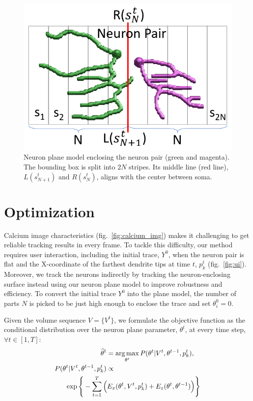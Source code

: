 \documentclass{article}
\DeclareMathOperator*{\argmax}{arg\,max}
\begin{document}
\begin{figure}[t]
	\centering
	\vspace{-10pt}
	\includegraphics[width=0.5\linewidth]{img/plane_model}
	\vspace{-10pt}
	\caption{\small{Neuron plane model enclosing the neuron pair (green and magenta). The bounding box is split into $2N$ stripes. Its middle line (red line), $L(s_{N+1}^t)$ and $R(s_N^t)$, aligns with the center between soma.}}
	\vspace{-10pt}
	\label{fig:planemodel}
\end{figure}


\section{Optimization}
Calcium image characteristics (fig.~\ref{fig:calcium_img}) makes it challenging to get reliable tracking results in every frame. To tackle this difficulty, our method requires user interaction, including the initial trace, $Y^0$, when the neuron pair is flat and the X-coordinate of the farthest dendrite tips at time $t$, $p^t_k$ (fig.~\ref{fig:ui}). Moreover, we track the neurons indirectly by tracking the neuron-enclosing surface instead using our neuron plane model to improve robustness and efficiency. To convert the initial trace $Y^0$ into the plane model, the number of parts $N$ is picked to be just high enough to enclose the trace and set $\theta_i^0 = 0$.

Given the volume sequence $V = \{V^t\}$, we formulate the objective function as the conditional distribution over the neuron plane parameter, $\theta^t$, at every time step, $\forall t \in [1, T]$:
\begin{equation}
\begin{aligned}
\widehat{\theta}^t & = \argmax_{\theta^t} P(\theta^t | V^t, \theta^{t-1}, p^t_k),  \\
P(\theta^t | V^t, \theta^{t-1}, p^t_k) & \propto \\
& \hspace{-60pt} \exp \Bigg\{ - \sum_{t=1}^T \Big( E_{x}(\theta^t,V^t, p^t_k) + E_{z}(\theta^t,\theta^{t-1}) \Big) \Bigg\}
\end{aligned}
\end{equation}
\end{document}
